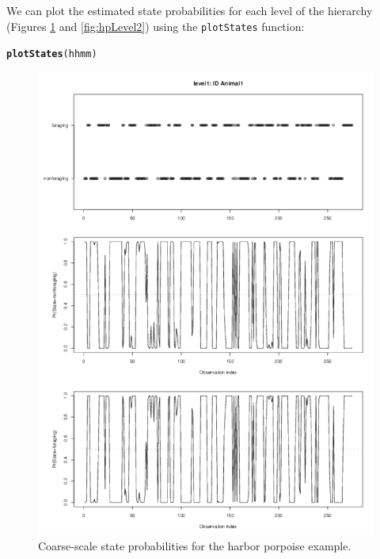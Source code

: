 \documentclass[12pt]{article}\usepackage[]{graphicx}\usepackage[]{color}
\makeatletter
\newcommand{\hlstd}[1]{\textcolor[rgb]{0.345,0.345,0.345}{#1}}%
\newcommand{\hlkwd}[1]{\textcolor[rgb]{0.737,0.353,0.396}{\textbf{#1}}}%
\newenvironment{kframe}{%
 \def\at@end@of@kframe{}%
 \ifinner\ifhmode%
  \def\at@end@of@kframe{\end{minipage}}%
  \begin{minipage}{\columnwidth}%
 \fi\fi%
 \def\FrameCommand##1{\hskip\@totalleftmargin \hskip-\fboxsep
 \colorbox{shadecolor}{##1}\hskip-\fboxsep
     \hskip-\linewidth \hskip-\@totalleftmargin \hskip\columnwidth}%
 \MakeFramed {\advance\hsize-\width
   \@totalleftmargin\z@ \linewidth\hsize
   \@setminipage}}%
 {\par\unskip\endMakeFramed%
 \at@end@of@kframe}
\newenvironment{knitrout}{}{} %
\makeatother
\begin{document}
We can plot the estimated state probabilities for each level of the hierarchy (Figures \ref{fig:hpLevel1} and \ref{fig:hpLevel2}) using the \verb|plotStates| function:
\begin{knitrout}
\color{fgcolor}\begin{kframe}
\begin{alltt}
\hlkwd{plotStates}\hlstd{(hhmm)}
\end{alltt}
\end{kframe}
\end{knitrout}
\begin{figure}[htbp]
  \centering
  \includegraphics[width=\textwidth]{plot_harborPorpoiseStates001.pdf}
  \caption{Coarse-scale state probabilities for the harbor porpoise example.}
  \label{fig:hpLevel1}
\end{figure}
\end{document}
